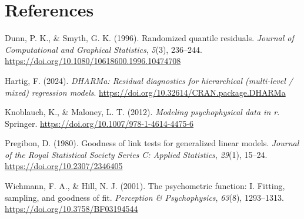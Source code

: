 \documentclass[
  man,
  floatsintext,
  longtable,
  nolmodern,
  notxfonts,
  notimes,
  colorlinks=true,linkcolor=blue,citecolor=blue,urlcolor=blue]{apa7}
\newlength{\cslhangindent}
\newenvironment{CSLReferences}[2] %
 {\begin{list}{}{%
  \setlength{\itemindent}{0pt}
  \setlength{\leftmargin}{0pt}
  \setlength{\parsep}{0pt}
  \ifodd #1
   \setlength{\leftmargin}{\cslhangindent}
   \setlength{\itemindent}{-1\cslhangindent}
  \fi
  \setlength{\itemsep}{#2\baselineskip}}}
 {\end{list}}
\begin{document}
\section{References}\label{references}

\protect{}\label{refs}
\begin{CSLReferences}{1}{0}
Dunn, P. K., \& Smyth, G. K. (1996). Randomized quantile residuals.
\emph{Journal of Computational and Graphical Statistics}, \emph{5}(3),
236--244. \url{https://doi.org/10.1080/10618600.1996.10474708}

Hartig, F. (2024). \emph{{DHARMa}: Residual diagnostics for hierarchical
(multi-level / mixed) regression models}.
\url{https://doi.org/10.32614/CRAN.package.DHARMa}

Knoblauch, K., \& Maloney, L. T. (2012). \emph{Modeling psychophysical
data in r}. Springer. \url{https://doi.org/10.1007/978-1-4614-4475-6}

Pregibon, D. (1980). Goodness of link tests for generalized linear
models. \emph{Journal of the Royal Statistical Society Series C: Applied
Statistics}, \emph{29}(1), 15--24. \url{https://doi.org/10.2307/2346405}

Wichmann, F. A., \& Hill, N. J. (2001). The psychometric function: I.
Fitting, sampling, and goodness of fit. \emph{Perception \&
Psychophysics}, \emph{63}(8), 1293--1313.
\url{https://doi.org/10.3758/BF03194544}

\end{CSLReferences}
\end{document}
